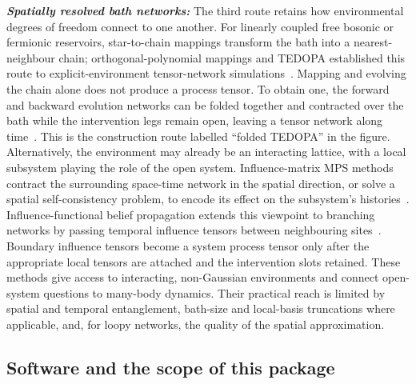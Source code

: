 \textbf{\emph{Spatially resolved bath networks:}}
The third route retains how environmental degrees of freedom connect to one another.
For linearly coupled free bosonic or fermionic reservoirs, star-to-chain mappings transform the bath into a nearest-neighbour chain; orthogonal-polynomial mappings and TEDOPA established this route to explicit-environment tensor-network simulations~\cite{Chin2010,Prior2010}.
Mapping and evolving the chain alone does not produce a process tensor.
To obtain one, the forward and backward evolution networks can be folded together and contracted over the bath while the intervention legs remain open, leaving a tensor network along time~\cite{ye2021influence,cerezo2025spatiotemporal}.
This is the construction route labelled ``folded TEDOPA'' in the figure.
Alternatively, the environment may already be an interacting lattice, with a local subsystem playing the role of the open system.
Influence-matrix MPS methods contract the surrounding space-time network in the spatial direction, or solve a spatial self-consistency problem, to encode its effect on the subsystem's histories~\cite{Lerose2021Influence,ye2021influence}.
Influence-functional belief propagation extends this viewpoint to branching networks by passing temporal influence tensors between neighbouring sites~\cite{Park2025Belief}.
Boundary influence tensors become a system process tensor only after the appropriate local tensors are attached and the intervention slots retained.
These methods give access to interacting, non-Gaussian environments and connect open-system questions to many-body dynamics.
Their practical reach is limited by spatial and temporal entanglement, bath-size and local-basis truncations where applicable, and, for loopy networks, the quality of the spatial approximation.

\subsection{Software and the scope of this package}
\label{sec:intro-software}

